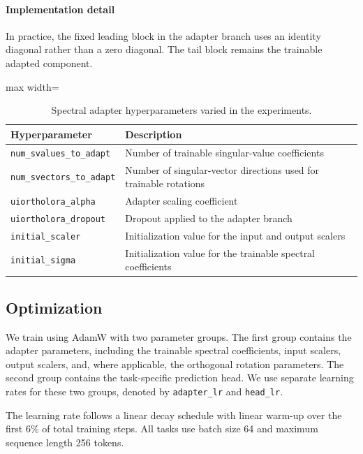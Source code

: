 \paragraph{Implementation detail}
In practice, the fixed leading block in the adapter branch uses an identity diagonal rather than a zero diagonal. The tail block remains the trainable adapted component.

\begin{table}[h]
\centering
\caption{Spectral adapter hyperparameters varied in the experiments.}
\label{tab:spectral_hyperparams}
\begin{adjustbox}{max width=\linewidth}
\begin{tabular}{ll}
\toprule
Hyperparameter & Description \\
\midrule
\texttt{num\_svalues\_to\_adapt} & Number of trainable singular-value coefficients \\
\texttt{num\_svectors\_to\_adapt} & Number of singular-vector directions used for trainable rotations \\
\texttt{uiortholora\_alpha} & Adapter scaling coefficient \\
\texttt{uiortholora\_dropout} & Dropout applied to the adapter branch \\
\texttt{initial\_scaler} & Initialization value for the input and output scalers \\
\texttt{initial\_sigma} & Initialization value for the trainable spectral coefficients \\
\bottomrule
\end{tabular}
\end{adjustbox}
\end{table}

\subsection{Optimization}

We train using AdamW with two parameter groups. The first group contains the adapter parameters, including the trainable spectral coefficients, input scalers, output scalers, and, where applicable, the orthogonal rotation parameters. The second group contains the task-specific prediction head. We use separate learning rates for these two groups, denoted by \texttt{adapter\_lr} and \texttt{head\_lr}.

The learning rate follows a linear decay schedule with linear warm-up over the first $6\%$ of total training steps. All tasks use batch size 64 and maximum sequence length 256 tokens.

